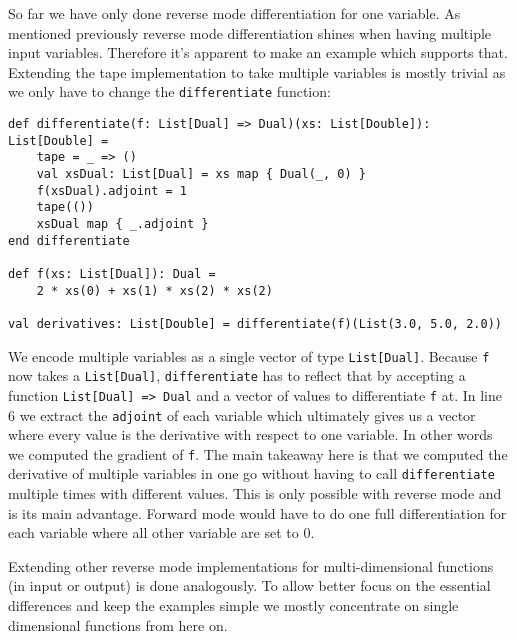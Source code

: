So far we have only done reverse mode differentiation for one variable. As mentioned previously reverse mode differentiation shines when having multiple input variables. Therefore it's apparent to make an example which supports that. Extending the tape implementation to take multiple variables is mostly trivial as we only have to change the \lstinline{differentiate} function:
\begin{lstlisting}
def differentiate(f: List[Dual] => Dual)(xs: List[Double]): List[Double] =
    tape = _ => ()
    val xsDual: List[Dual] = xs map { Dual(_, 0) }
    f(xsDual).adjoint = 1
    tape(())
    xsDual map { _.adjoint }
end differentiate

def f(xs: List[Dual]): Dual =
    2 * xs(0) + xs(1) * xs(2) * xs(2)

val derivatives: List[Double] = differentiate(f)(List(3.0, 5.0, 2.0))
\end{lstlisting}
We encode multiple variables as a single vector of type \lstinline{List[Dual]}. Because \lstinline{f} now takes a \lstinline{List[Dual]}, \lstinline{differentiate} has to reflect that by accepting a function \lstinline{List[Dual] => Dual} and a vector of values to differentiate \lstinline{f} at. In line 6 we extract the \lstinline{adjoint} of each variable which ultimately gives us a vector where every value is the derivative with respect to one variable. In other words we computed the gradient of \lstinline{f}. The main takeaway here is that we computed the derivative of multiple variables in one go without having to call \lstinline{differentiate} multiple times with different values. This is only possible with reverse mode and is its main advantage. Forward mode would have to do one full differentiation for each variable where all other variable are set to 0.

Extending other reverse mode implementations for multi-dimensional functions (in input or output) is done analogously. To allow better focus on the essential differences and keep the examples simple we mostly concentrate on single dimensional functions from here on.